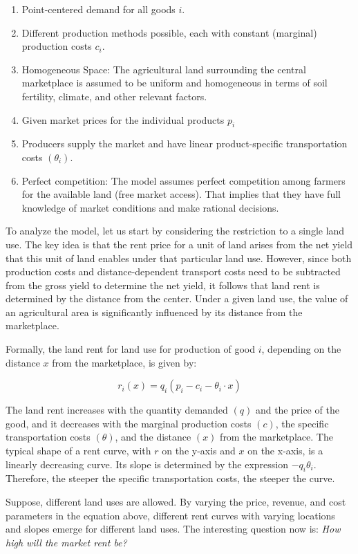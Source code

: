 \documentclass[
  12pt,
  oneside]{book}
\providecommand{\tightlist}{%
  \setlength{\itemsep}{0pt}\setlength{\parskip}{0pt}}
\theoremstyle{definition}
\theoremstyle{definition}
\theoremstyle{definition}
\theoremstyle{definition}
\theoremstyle{remark}
\begin{document}
\begin{enumerate}
\def\labelenumi{\arabic{enumi}.}
\tightlist
\item
  Point-centered demand for all goods \(i\).
\item
  Different production methods possible, each with constant (marginal) production costs \(c_i\).
\item
  Homogeneous Space: The agricultural land surrounding the central marketplace is assumed to be uniform and homogeneous in terms of soil fertility, climate, and other relevant factors.
\item
  Given market prices for the individual products \(p_i\)
\item
  Producers supply the market and have linear product-specific transportation costs \((\theta_i)\).
\item
  Perfect competition: The model assumes perfect competition among farmers for the available land (free market access). That implies that they have full knowledge of market conditions and make rational decisions.
\end{enumerate}

To analyze the model, let us start by considering the restriction to a single land use. The key idea is that the rent price for a unit of land arises from the net yield that this unit of land enables under that particular land use. However, since both production costs and distance-dependent transport costs need to be subtracted from the gross yield to determine the net yield, it follows that land rent is determined by the distance from the center. Under a given land use, the value of an agricultural area is significantly influenced by its distance from the marketplace.

Formally, the land rent for land use for production of good \(i\), depending on the distance \(x\) from the marketplace, is given by:

\[
r_i(x) = q_i(p_i - c_i - \theta_i \cdot x)
\]

The land rent increases with the quantity demanded \((q)\) and the price of the good, and it decreases with the marginal production costs \((c)\), the specific transportation costs \((\theta)\), and the distance \((x)\) from the marketplace. The typical shape of a rent curve, with \(r\) on the y-axis and \(x\) on the x-axis, is a linearly decreasing curve. Its slope is determined by the expression \(-q_i \theta_i\). Therefore, the steeper the specific transportation costs, the steeper the curve.

Suppose, different land uses are allowed. By varying the price, revenue, and cost parameters in the equation above, different rent curves with varying locations and slopes emerge for different land uses. The interesting question now is: \emph{How high will the market rent be?}
\end{document}
